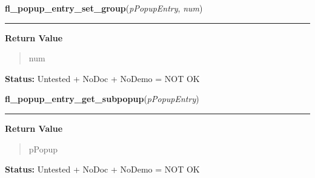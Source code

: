     \label{xformslib:library:fl_popup_entry_set_group}

    \vspace{0.5ex}

\hspace{.8\funcindent}\begin{boxedminipage}{\funcwidth}

    \raggedright \textbf{fl\_popup\_entry\_set\_group}(\textit{pPopupEntry}, \textit{num})

    \vspace{-1.5ex}

    \rule{\textwidth}{0.5\fboxrule}
\setlength{\parskip}{2ex}
\setlength{\parskip}{1ex}
      \textbf{Return Value}
    \vspace{-1ex}

      \begin{quote}
      num

      \end{quote}

\textbf{Status:} Untested + NoDoc + NoDemo = NOT OK



    \end{boxedminipage}

    \label{xformslib:library:fl_popup_entry_get_subpopup}

    \vspace{0.5ex}

\hspace{.8\funcindent}\begin{boxedminipage}{\funcwidth}

    \raggedright \textbf{fl\_popup\_entry\_get\_subpopup}(\textit{pPopupEntry})

    \vspace{-1.5ex}

    \rule{\textwidth}{0.5\fboxrule}
\setlength{\parskip}{2ex}
\setlength{\parskip}{1ex}
      \textbf{Return Value}
    \vspace{-1ex}

      \begin{quote}
      pPopup

      \end{quote}

\textbf{Status:} Untested + NoDoc + NoDemo = NOT OK



    \end{boxedminipage}

